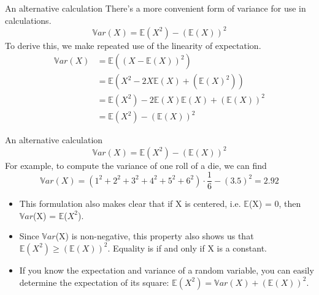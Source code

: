 \documentclass[aspectratio=169]{../latex_main/tntbeamer}  %
\begin{document}
	
	\begin{frame}[c]{An alternative calculation}
	    There’s a more convenient form of variance for use in calculations.
	    \begin{equation*}
	        \mathbb{V}ar(X) = \mathbb{E}(X^2) - (\mathbb{E}(X))^2
	    \end{equation*}
	    To derive this, we make repeated use of the linearity of expectation.
	    \begin{align*}
	        \mathbb{V}ar(X) &= \mathbb{E}((X-\mathbb{E}(X))^2)\\
	        &=  \mathbb{E}(X^2-2X\mathbb{E}(X) + (\mathbb{E}(X)^2))\\
	        &= \mathbb{E}(X^2) - 2\mathbb{E}(X)\mathbb{E}(X) + (\mathbb{E}(X))^2\\
	        &= \mathbb{E}(X^2) - (\mathbb{E}(X))^2
	    \end{align*}
	\end{frame}
	
	
	
	\begin{frame}[c]{An alternative calculation}
	    \begin{equation*}
	        \mathbb{V}ar(X) = \mathbb{E}(X^2) - (\mathbb{E}(X))^2
	    \end{equation*}
	    For example, to compute the variance of one roll of a die, we can find
	    \begin{equation*}
	        \mathbb{V}ar(X)= (1^2+2^2+3^2+4^2+5^2+6^2)\cdot \frac{1}{6}-(3.5)^2 = 2.92
	    \end{equation*}
	    
	    \begin{itemize}
	        \item This formulation also makes clear that if X is centered, i.e. $\mathbb{E}$(X) = 0, then $\mathbb{V}ar$(X) = $\mathbb{E}$($X^2$).
	        \item Since $\mathbb{V}ar$(X) is non-negative, this property also shows us that                   $\mathbb{E}(X^2) \geq (\mathbb{E}(X))^2$.      Equality is if and only if X is a constant.
	        \item If you know the expectation and variance of a random variable, you can easily determine the expectation of its square:   $\mathbb{E}(X^2) = \mathbb{V}ar(X) + (\mathbb{E}(X))^2$. 
	    \end{itemize}
	\end{frame}
	
\end{document}
